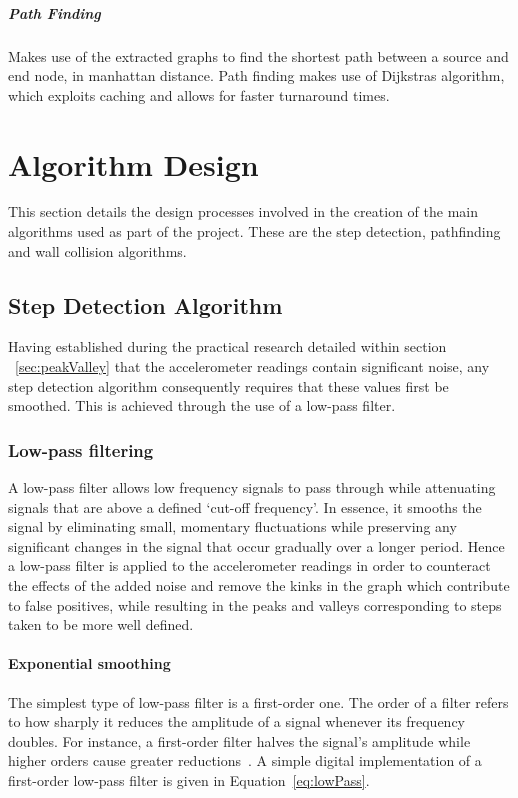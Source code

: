 \documentclass[12pt,a4paper]{report}
\begin{document}
\paragraph{Path Finding}
Makes use of the extracted graphs to find the shortest path between a source and end node, in manhattan distance. Path finding makes use of Dijkstras algorithm, which exploits caching and allows for faster turnaround times.

\chapter{Algorithm Design}

This section details the design processes involved in the creation of the main algorithms used as part of the project. These are the step detection, pathfinding and wall collision algorithms.

\section{Step Detection Algorithm}
Having established during the practical research detailed within section ~\ref{sec:peakValley} that the accelerometer readings contain significant noise, any step detection algorithm consequently requires that these values first be smoothed. This is achieved through the use of a low-pass filter.

\subsection{Low-pass filtering}

A low-pass filter allows low frequency signals to pass through while attenuating signals that are above a defined `cut-off frequency'. In essence, it smooths the signal by eliminating small, momentary fluctuations while preserving any significant changes in the signal that occur gradually over a longer period. Hence a low-pass filter is applied to the accelerometer readings in order to counteract the effects of the added noise and remove the kinks in the graph which contribute to false positives, while resulting in the peaks and valleys corresponding to steps taken to be more well defined. 

\subsubsection{Exponential smoothing}

The simplest type of low-pass filter is a first-order one. The order of a filter refers to how sharply it reduces the amplitude of a signal whenever its frequency doubles. For instance, a first-order filter halves the signal's amplitude while higher orders cause greater reductions~\cite[p.2528]{casiez20121}. A simple digital implementation of a first-order low-pass filter is given in Equation~\ref{eq:lowPass}.   
\end{document}
